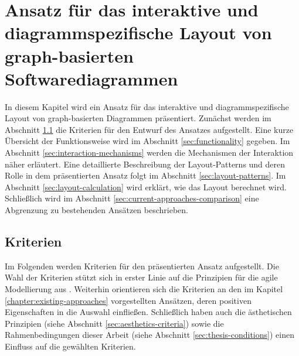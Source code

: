
\chapter{Ansatz für das interaktive und diagrammspezifische Layout von graph-basierten Softwarediagrammen}
\label{chapter:interactive-approach}

In diesem Kapitel wird ein Ansatz für das interaktive und diagrammspezifische Layout von graph-basierten Diagrammen präsentiert. Zunächst werden im Abschnitt \ref{sec:criteria} die Kriterien für den Entwurf des Ansatzes aufgestellt. Eine kurze Übersicht der Funktionsweise wird im Abschnitt \ref{sec:functionality} gegeben. Im Abschnitt \ref{sec:interaction-mechanisms} werden die Mechanismen der Interaktion näher erläutert. Eine detaillierte Beschreibung der Layout-Patterns und deren Rolle in dem präsentierten Ansatz folgt im Abschnitt \ref{sec:layout-patterns}. Im Abschnitt \ref{sec:layout-calculation} wird erklärt, wie das Layout berechnet wird. Schließlich wird im Abschnitt \ref{sec:current-approaches-comparison} eine Abgrenzung zu bestehenden Ansätzen beschrieben.


\section{Kriterien}
\label{sec:criteria}

Im Folgenden werden Kriterien für den präsentierten Ansatz aufgestellt. Die Wahl der Kriterien stützt sich in erster Linie auf die Prinzipien für die agile Modellierung aus \cite{Ambler02Agile}. Weiterhin orientieren sich die Kriterien an den im Kapitel \ref{chapter:existing-approaches} vorgestellten Ansätzen, deren positiven Eigenschaften in die Auswahl einfließen.   Schließlich haben auch die ästhetischen Prinzipien (siehe Abschnitt \ref{sec:aesthetics-criteria}) sowie die Rahmenbedingungen dieser Arbeit (siehe Abschnitt \ref{sec:thesis-conditions}) einen Einfluss auf die gewählten Kriterien.

